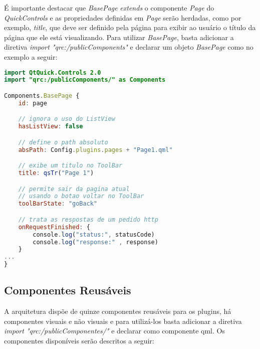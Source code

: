 É importante destacar que \textit{BasePage} \textit{extends} o componente \textit{Page} do \textit{QuickControls} e as propriedades definidas em \textit{Page} serão herdadas, como por exemplo, \textit{title}, que deve ser definido pela página para exibir ao usuário o título da página que ele está visualizando. Para utilizar \textit{BasePage}, basta adicionar a diretiva \textit{import "qrc:/publicComponents"} e declarar um objeto \textit{BasePage} como no exemplo a seguir:

\begin{center}
\begin{lstlisting}[language=qml]
import QtQuick.Controls 2.0
import "qrc:/publicComponents/" as Components

Components.BasePage {
	id: page

	// ignora o uso do ListView
	hasListView: false

	// define o path absoluto
	absPath: Config.plugins.pages + "Page1.qml"

	// exibe um titulo no ToolBar
	title: qsTr("Page 1")

	// permite sair da pagina atual
	// usando o botao voltar no ToolBar
	toolBarState: "goBack"

	// trata as respostas de um pedido http
	onRequestFinished: {
		console.log("status:", statusCode)
		console.log("response:" , response)
	}
...
}
\end{lstlisting}
\end{center}


\subsection{Componentes Reusáveis}\label{sec:solucao-desenvolvida}
A arquitetura dispõe de quinze componentes reusáveis para os plugins, há componentes visuais e não visuais e para utilizá-los basta adicionar a diretiva \textit{import "qrc:/publicComponentes/"} e declarar como componente qml. Os componentes disponíveis serão descritos a seguir:

